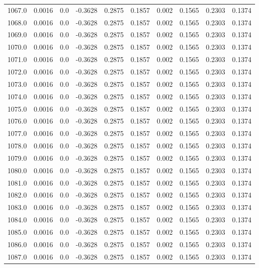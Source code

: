 \begin{longtable}{lrrrrrrrrr}
1067.0 & 0.0016 & 0.0 & -0.3628 & 0.2875 & 0.1857 & 0.002 & 0.1565 & 0.2303 & 0.1374 \\
1068.0 & 0.0016 & 0.0 & -0.3628 & 0.2875 & 0.1857 & 0.002 & 0.1565 & 0.2303 & 0.1374 \\
1069.0 & 0.0016 & 0.0 & -0.3628 & 0.2875 & 0.1857 & 0.002 & 0.1565 & 0.2303 & 0.1374 \\
1070.0 & 0.0016 & 0.0 & -0.3628 & 0.2875 & 0.1857 & 0.002 & 0.1565 & 0.2303 & 0.1374 \\
1071.0 & 0.0016 & 0.0 & -0.3628 & 0.2875 & 0.1857 & 0.002 & 0.1565 & 0.2303 & 0.1374 \\
1072.0 & 0.0016 & 0.0 & -0.3628 & 0.2875 & 0.1857 & 0.002 & 0.1565 & 0.2303 & 0.1374 \\
1073.0 & 0.0016 & 0.0 & -0.3628 & 0.2875 & 0.1857 & 0.002 & 0.1565 & 0.2303 & 0.1374 \\
1074.0 & 0.0016 & 0.0 & -0.3628 & 0.2875 & 0.1857 & 0.002 & 0.1565 & 0.2303 & 0.1374 \\
1075.0 & 0.0016 & 0.0 & -0.3628 & 0.2875 & 0.1857 & 0.002 & 0.1565 & 0.2303 & 0.1374 \\
1076.0 & 0.0016 & 0.0 & -0.3628 & 0.2875 & 0.1857 & 0.002 & 0.1565 & 0.2303 & 0.1374 \\
1077.0 & 0.0016 & 0.0 & -0.3628 & 0.2875 & 0.1857 & 0.002 & 0.1565 & 0.2303 & 0.1374 \\
1078.0 & 0.0016 & 0.0 & -0.3628 & 0.2875 & 0.1857 & 0.002 & 0.1565 & 0.2303 & 0.1374 \\
1079.0 & 0.0016 & 0.0 & -0.3628 & 0.2875 & 0.1857 & 0.002 & 0.1565 & 0.2303 & 0.1374 \\
1080.0 & 0.0016 & 0.0 & -0.3628 & 0.2875 & 0.1857 & 0.002 & 0.1565 & 0.2303 & 0.1374 \\
1081.0 & 0.0016 & 0.0 & -0.3628 & 0.2875 & 0.1857 & 0.002 & 0.1565 & 0.2303 & 0.1374 \\
1082.0 & 0.0016 & 0.0 & -0.3628 & 0.2875 & 0.1857 & 0.002 & 0.1565 & 0.2303 & 0.1374 \\
1083.0 & 0.0016 & 0.0 & -0.3628 & 0.2875 & 0.1857 & 0.002 & 0.1565 & 0.2303 & 0.1374 \\
1084.0 & 0.0016 & 0.0 & -0.3628 & 0.2875 & 0.1857 & 0.002 & 0.1565 & 0.2303 & 0.1374 \\
1085.0 & 0.0016 & 0.0 & -0.3628 & 0.2875 & 0.1857 & 0.002 & 0.1565 & 0.2303 & 0.1374 \\
1086.0 & 0.0016 & 0.0 & -0.3628 & 0.2875 & 0.1857 & 0.002 & 0.1565 & 0.2303 & 0.1374 \\
1087.0 & 0.0016 & 0.0 & -0.3628 & 0.2875 & 0.1857 & 0.002 & 0.1565 & 0.2303 & 0.1374 \\

\end{longtable}
